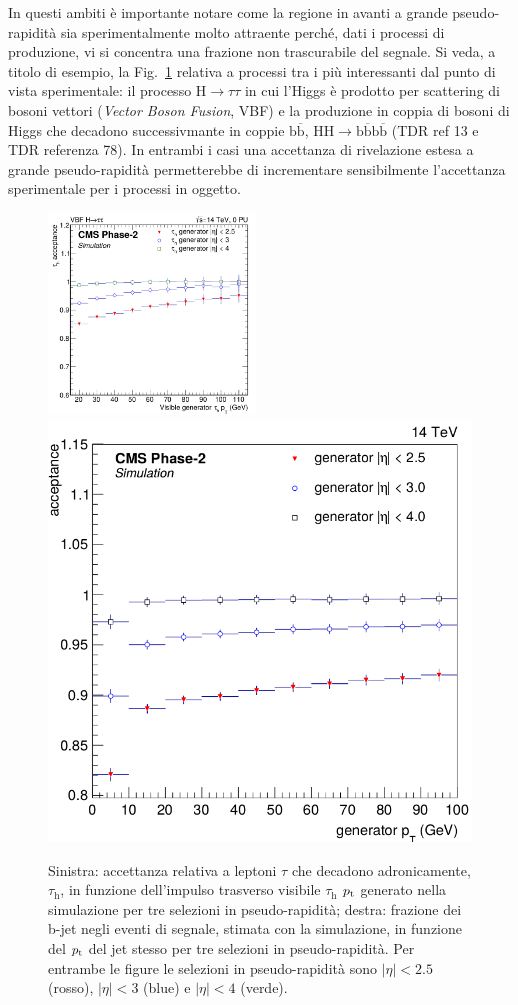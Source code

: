 In questi ambiti \`e importante notare come la regione in avanti a grande pseudo-rapidit\`a sia sperimentalmente molto attraente perch\'e, dati i processi di produzione, vi si concentra una frazione non trascurabile del segnale. Si veda, a titolo di esempio, la Fig.~\ref{fig:VBFHtt_HH4b} relativa a processi tra i pi\`u interessanti dal punto di vista sperimentale: il processo H$\rightarrow \tau\tau$ in cui l'Higgs \`e prodotto per scattering di bosoni vettori ({\em Vector Boson Fusion}, VBF) e la produzione in coppia di bosoni di Higgs che decadono successivmante in coppie $\mathrm{b}\overline{\mathrm{b}}$, $\mathrm{HH}\rightarrow \mathrm{b}\overline{\mathrm{b}}\mathrm{b}\overline{\mathrm{b}}$ (TDR ref 13 e TDR referenza 78). In entrambi i casi una accettanza di rivelazione estesa a grande pseudo-rapidit\`a permetterebbe di incrementare sensibilmente l'accettanza sperimentale per i processi in oggetto.
\begin{figure}[t]
\centering
\includegraphics[width=0.49\textwidth]{Immagini/VBF_tau_acceptance}
\hfill
\includegraphics[width=0.48\linewidth]{Immagini/HH4bacc}
\caption{Sinistra: accettanza relativa a leptoni $\tau$ che decadono adronicamente, $\tau_{\mathrm{h}}$, in funzione dell'impulso trasverso visibile  $\tau_{\mathrm{h}}$ ${p_{\rm t}}$ generato nella simulazione per tre selezioni in pseudo-rapidit\`a; destra: frazione dei b-jet negli eventi di segnale, stimata con la simulazione, in funzione del ${p_{\rm t}}$ del jet stesso per tre selezioni in pseudo-rapidit\`a. Per entrambe le figure le selezioni in pseudo-rapidit\`a sono $|\eta|<2.5$ (rosso), $|\eta|<3$ (blue) e $|\eta|<4$ (verde).
}
\label{fig:VBFHtt_HH4b}
\end{figure}

